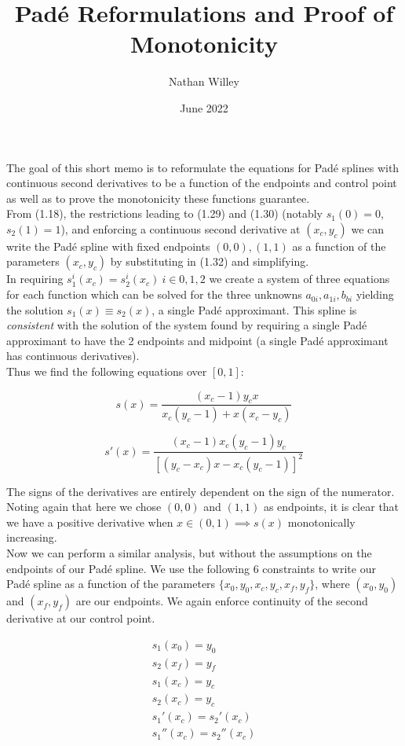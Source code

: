 \documentclass{article}
\title{Pad\'{e} Reformulations and Proof of Monotonicity}
\author{Nathan Willey}
\date{June 2022}
\begin{document}
	
	\maketitle{}
	
	The goal of this short memo is to reformulate the equations for Pad\'{e} splines with continuous second derivatives to be a function of the endpoints and control point as well as to prove the monotonicity these functions guarantee.\\
	
	From (1.18), the restrictions leading to (1.29) and (1.30) (notably $s_1(0) = 0$, $s_2(1) = 1$), and enforcing a continuous second derivative at $(x_c, y_c)$ we can write the Pad\'{e} spline with fixed endpoints $(0,0), (1,1)$ as a function of the parameters $(x_c, y_c)$ by substituting in (1.32) and simplifying. \\
	In requiring $s_1^i(x_c) = s_2^i(x_c) \ i \in {0,1,2}$ we create a system of three equations for each function which can be solved for the three unknowns $a_{0i}, a_{1i}, b_{bi}$ yielding the solution $s_1(x) \equiv s_2(x)$, a single Pad\'{e} approximant. This spline is \textit{consistent} with the solution of the system found by requiring a single Pad\'{e} approximant to have the 2 endpoints and midpoint (a single Pad\'{e} approximant has continuous derivatives). \\ Thus we find the following equations over $[0,1]$:
	
	\[s(x) = \frac{(x_c - 1) y_c x}{x_c(y_c - 1) + x(x_c - y_c)}\]
	
	\[s'(x) = \frac{(x_c - 1)x_c(y_c-1)y_c}{[(y_c-x_c)x - x_c(y_c-1)]^2}\]
	
	
	The signs of the derivatives are entirely dependent on the sign of the numerator. Noting again that here we chose $(0,0)$ and $(1,1)$ as endpoints, it is clear that we have a positive derivative when $x \in (0,1) \implies s(x)$ monotonically increasing. \\
	
	
	Now we can perform a similar analysis, but without the assumptions on the endpoints of our Pad\'{e} spline. We use the following 6 constraints to write our Pad\'{e} spline as a function of the parameters $\{x_0, y_0, x_c, y_c, x_f, y_f\}$, where $(x_0, y_0)$ and $(x_f, y_f)$ are our endpoints. We again enforce continuity of the second derivative at our control point.
	
	\begin{align}
		s_1(x_0) = y_0 \\
		s_2(x_f) = y_f \\ 
		s_1(x_c) = y_c \\
		s_2(x_c) = y_c \\ 
		s_1'(x_c) = s_2'(x_c) \\ 
		s_1''(x_c) = s_2''(x_c) 
	\end{align}
\end{document}
